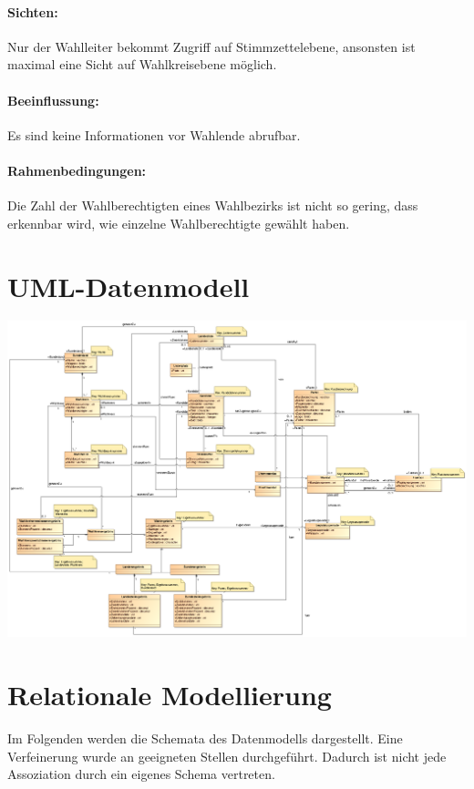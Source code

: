 \documentclass[a4paper]{article}
\begin{document}
\paragraph{Sichten:} Nur der Wahlleiter bekommt Zugriff auf Stimmzettelebene, ansonsten ist maximal eine Sicht auf Wahlkreisebene möglich.

\paragraph{Beeinflussung:} Es sind keine Informationen vor Wahlende abrufbar.

\paragraph{Rahmenbedingungen:} Die Zahl der Wahlberechtigten eines Wahlbezirks ist nicht so gering, dass erkennbar wird, wie einzelne Wahlberechtigte gewählt haben.

\section{UML-Datenmodell}

\includegraphics[scale=1,angle=90]{datenmodell.eps}

\section{Relationale Modellierung}

Im Folgenden werden die Schemata des Datenmodells dargestellt. Eine Verfeinerung wurde an geeigneten Stellen durchgeführt. Dadurch ist nicht jede Assoziation durch ein eigenes Schema vertreten.
\end{document}
